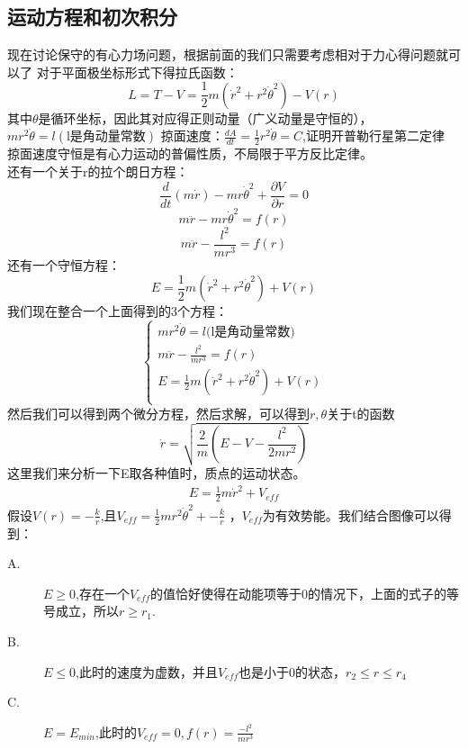\documentclass[UTF8,10pt]{article}
\begin{document}
\subsection{运动方程和初次积分}
现在讨论保守的有心力场问题，根据前面的我们只需要考虑相对于力心得问题就可以了
对于平面极坐标形式下得拉氏函数：
$$
    L=T-V=\frac{1}{2}m\left( \dot{r}^2+r^2\dot{\theta}^2 \right) -V\left( r \right)
$$
其中$\theta$是循环坐标，因此其对应得正则动量（广义动量是守恒的），$mr^2\dot{\theta}=l(\text{l是角动量常数})$
掠面速度：$\frac{dA}{dt}=\frac{1}{2}r^2\dot{\theta}=C$,证明开普勒行星第二定律
掠面速度守恒是有心力运动的普偏性质，不局限于平方反比定律。\\
还有一个关于r的拉个朗日方程：
\begin{equation*}
    \frac{d}{d t}(m \dot{r})-m r \dot{\theta}^{2}+\frac{\partial V}{\partial r}=0
\end{equation*}
\begin{equation*}
    m \ddot{r}-m r \dot{\theta}^{2}=f(r)
\end{equation*}
$$
    m \ddot{r}-\frac{l^{2}}{m r^{3}}=f(r)
$$
还有一个守恒方程：
$$
    E=\frac{1}{2} m\left(\dot{r}^{2}+r^{2} \dot{\theta}^{2}\right)+V(r)
$$
我们现在整合一个上面得到的3个方程：
$$
    \begin{cases}
        mr^2\dot{\theta}=l(\text{l是角动量常数)}                       \\
        m \ddot{r}-\frac{l^{2}}{m r^{3}}=f(r)                          \\
        E=\frac{1}{2}m\left( \dot{r}^2+r^2\dot{\theta}^2 \right) +V(r) \\
    \end{cases}
$$
然后我们可以得到两个微分方程，然后求解，可以得到$r,\theta$关于t的函数
$$
    \dot{r}=\sqrt{\frac{2}{m}\left(E-V-\frac{l^{2}}{2 m r^{2}}\right)}
$$
这里我们来分析一下E取各种值时，质点的运动状态。
\begin{align*}
    E=\frac{1}{2}m\dot{r}^2+V_{eff}
\end{align*}
假设$V(r)=-\frac{k}{r}$,且$V_{eff}=\frac{1}{2}mr^2\dot{\theta}^2+-\frac{k}{r}$
，$V_{eff}$为有效势能。我们结合图像可以得到：

\begin{description}
    \item[A.] $E\geq 0$,存在一个$V_{eff}$的值恰好使得在动能项等于0的情况下，上面的式子的等号成立，所以$r\geq r_1$.
    \item[B.] $E\leq 0$,此时的速度为虚数，并且$V_{eff}$也是小于0的状态，$r_2\leq r\leq r_4$
    \item[C.] $E=E_{min}$,此时的$V_{eff}=0,f(r)=\frac{-l^2}{mr^3}$
\end{description}
\end{document}
